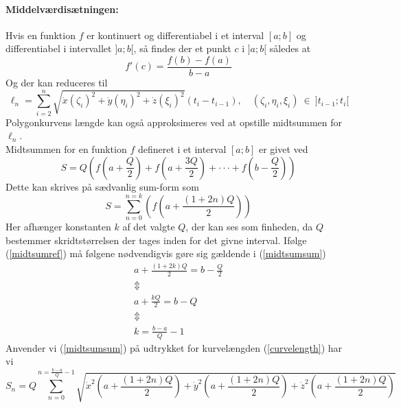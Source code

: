 \paragraph{Middelværdisætningen:} 
Hvis en funktion \(f\) er kontinuert og differentiabel i et interval \([a;b]\) og differentiabel i intervallet \(]a;b[\), så findes der et punkt \(c\) i \(]a;b[\) således at
\begin{equation}
f\prime(c) = \frac{f(b)-f(a)}{b-a}
\end{equation}
Og der kan reduceres til
\begin{equation}
 \ell _n = \sum\limits_{i=2}^n \sqrt{ \dot{x}(\zeta_i)^2 +\dot{y}(\eta_i)^2 + \dot{z}(\xi_i)^2}(t_i-t_{i-1}), \quad (\zeta_i, \eta_i, \xi_i) ~ \in ~ ]t_{i-1};t_i[
 \label{ellndiff}
\end{equation}
Polygonkurvens længde kan også approksimeres ved at opstille midtsummen for \(\ell_n\).\\
Midtsummen for en funktion \(f\) defineret i et interval \([a;b]\) er givet ved
\begin{equation}
S=Q\left(f\left(a+\frac{Q}{2}\right) + f\left(a+\frac{3Q}{2}\right) + \cdot\cdot\cdot + f\left(b-\frac{Q}{2}\right)\right)
\label{midtsumref}
\end{equation}
Dette kan skrives på sædvanlig sum-form som
\begin{equation}
S=\sum\limits_{n=0}^{n=k} \left(f\left(a+\frac{(1+2n)Q}{2}\right)\right)
\label{midtsumsum}
\end{equation}
Her afhænger konstanten \(k\) af det valgte \(Q\), der kan ses som finheden, da \(Q\) bestemmer skridtstørrelsen der tages inden for det givne interval. Ifølge (\ref{midtsumref}) må følgene nødvendigvis gøre sig gældende i (\ref{midtsumsum})
\begin{equation}
\begin{gathered}
a+\frac{(1+2k)Q}{2} =b-\frac{Q}{2} \\
\Updownarrow \\
a+\frac{kQ}{2} = b-Q \\
\Updownarrow \\
k = \frac{b-a}{Q}-1
\end{gathered}
\end{equation}
Anvender vi (\ref{midtsumsum}) på udtrykket for kurvelængden (\ref{curvelength}) har vi
\begin{equation}
S_n = Q\sum\limits_{n=0}^{n=\frac{b-a}{Q}-1}\sqrt{\dot{x}^2\left(a+\frac{(1+2n)Q}{2}\right)+\dot{y}^2\left(a+\frac{(1+2n)Q}{2}\right)+\dot{z}^2\left(a+\frac{(1+2n)Q}{2}\right)}
\label{Snfinal}
\end{equation}

